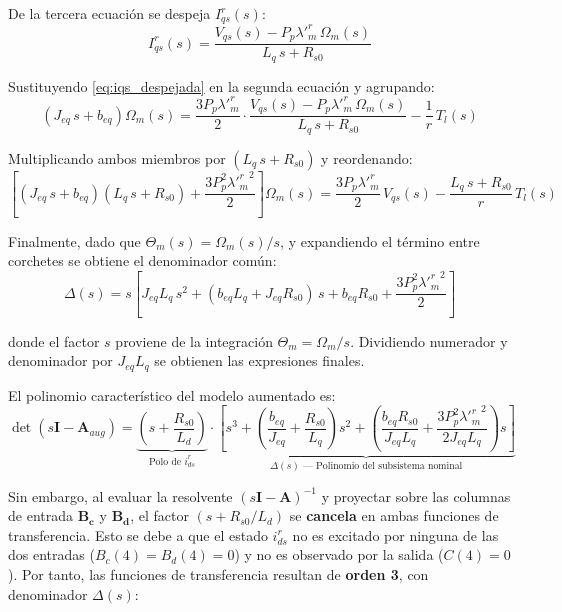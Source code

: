 \documentclass[12pt, a4paper,journal, onecolumn, compsoc]{IEEEtran}
\begin{document}
De la tercera ecuación se despeja $I_{qs}^r(s)$:
\begin{equation}\label{eq:iqs_despejada}
    I_{qs}^r(s) = \frac{V_{qs}(s) - P_p \lambda'^r_m\,\Omega_m(s)}{L_q\,s + R_{s0}}
\end{equation}

Sustituyendo \eqref{eq:iqs_despejada} en la segunda ecuación y agrupando:
\begin{equation}
    \left(J_{eq}\,s + b_{eq}\right)\Omega_m(s) = \frac{3 P_p \lambda'^r_m}{2} \cdot \frac{V_{qs}(s) - P_p \lambda'^r_m\,\Omega_m(s)}{L_q\,s + R_{s0}} - \frac{1}{r}\,T_l(s)
\end{equation}

Multiplicando ambos miembros por $(L_q\,s + R_{s0})$ y reordenando:
\begin{equation}
    \left[(J_{eq}\,s + b_{eq})(L_q\,s + R_{s0}) + \frac{3 P_p^2 {\lambda'^r_m}^2}{2}\right]\Omega_m(s) = \frac{3 P_p \lambda'^r_m}{2}\,V_{qs}(s) - \frac{L_q\,s + R_{s0}}{r}\,T_l(s)
\end{equation}

Finalmente, dado que $\Theta_m(s) = \Omega_m(s)/s$, y expandiendo el término entre corchetes se obtiene el denominador común:
\begin{equation}
    \Delta(s) = s\left[J_{eq} L_q\,s^2 + (b_{eq} L_q + J_{eq} R_{s0})\,s + b_{eq} R_{s0} + \frac{3 P_p^2 {\lambda'^r_m}^2}{2}\right]
\end{equation}

donde el factor $s$ proviene de la integración $\Theta_m = \Omega_m / s$. Dividiendo numerador y denominador por $J_{eq} L_q$ se obtienen las expresiones finales.

\vspace{0.3cm}

El polinomio característico del modelo aumentado es:
\begin{equation}
    \det(s\mathbf{I} - \mathbf{A}_{aug}) = \underbrace{\left(s + \frac{R_{s0}}{L_d}\right)}_{\text{Polo de } i_{ds}^r} \cdot \underbrace{\left[ s^3 + \left(\frac{b_{eq}}{J_{eq}} + \frac{R_{s0}}{L_q}\right)s^2 + \left(\frac{b_{eq} R_{s0}}{J_{eq} L_q} + \frac{3 P_p^2 {\lambda'^r_m}^2}{2 J_{eq} L_q}\right)s \right]}_{\Delta(s) \text{ --- Polinomio del subsistema nominal}}
\end{equation}

Sin embargo, al evaluar la resolvente $(s\mathbf{I}-\mathbf{A})^{-1}$ y proyectar sobre las columnas de entrada $\mathbf{B_c}$ y $\mathbf{B_d}$, el factor $(s + R_{s0}/L_d)$ se \textbf{cancela} en ambas funciones de transferencia. Esto se debe a que el estado $i_{ds}^r$ no es excitado por ninguna de las dos entradas ($B_c(4) = B_d(4) = 0$) y no es observado por la salida ($C(4) = 0$). Por tanto, las funciones de transferencia resultan de \textbf{orden 3}, con denominador $\Delta(s)$:
\end{document}
